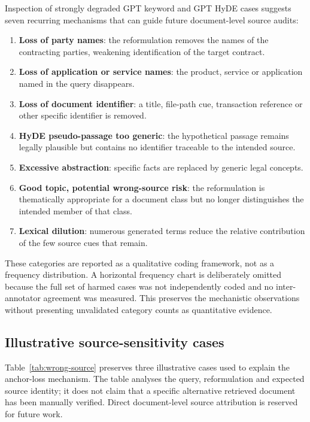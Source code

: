 \documentclass[a4paper,fleqn]{cas-dc}
\begin{document}
Inspection of strongly degraded GPT keyword and GPT HyDE cases suggests
seven recurring mechanisms that can guide future document-level source
audits:
\begin{enumerate}
    \item \textbf{Loss of party names}: the reformulation removes the
    names of the contracting parties, weakening identification of the
    target contract.
    \item \textbf{Loss of application or service names}: the product,
    service or application named in the query disappears.
    \item \textbf{Loss of document identifier}: a title, file-path cue,
    transaction reference or other specific identifier is removed.
    \item \textbf{HyDE pseudo-passage too generic}: the hypothetical
    passage remains legally plausible but contains no identifier
    traceable to the intended source.
    \item \textbf{Excessive abstraction}: specific facts are replaced by
    generic legal concepts.
    \item \textbf{Good topic, potential wrong-source risk}: the
    reformulation is thematically appropriate for a document class but
    no longer distinguishes the intended member of that class.
    \item \textbf{Lexical dilution}: numerous generated terms reduce the
    relative contribution of the few source cues that remain.
\end{enumerate}

These categories are reported as a qualitative coding framework, not as
a frequency distribution. A horizontal frequency chart is deliberately
omitted because the full set of harmed cases was not independently coded
and no inter-annotator agreement was measured. This preserves the
mechanistic observations without presenting unvalidated category counts
as quantitative evidence.

\subsection{Illustrative source-sensitivity cases}
\label{sec:qualitative-cases}

Table~\ref{tab:wrong-source} preserves three illustrative cases used to
explain the anchor-loss mechanism. The table analyses the query,
reformulation and expected source identity; it does not claim that a
specific alternative retrieved document has been manually verified.
Direct document-level source attribution is reserved for future work.
\end{document}
